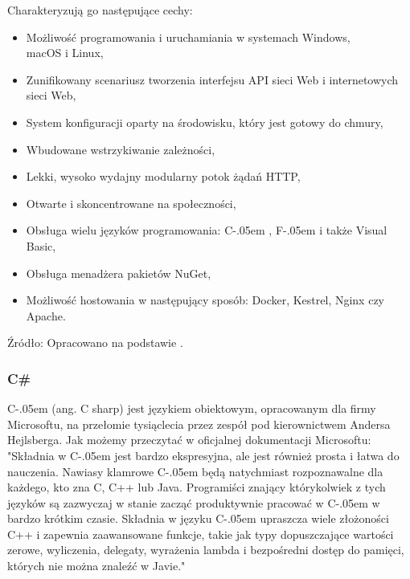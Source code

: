 \documentclass[12pt]{article}
\newcommand{\Csharp}{%
  {\settoheight{\dimen0}{C}C\kern-.05em \resizebox{!}{\dimen0}{\raisebox{\depth}{\# }}}}
\newcommand{\Fsharp}{%
  {\settoheight{\dimen0}{F}F\kern-.05em \resizebox{!}{\dimen0}{\raisebox{\depth}{\# }}}}
\numberwithin{figure}{section}
\begin{document}
Charakteryzują go następujące cechy:
    \begin{itemize}
        \item Możliwość programowania i uruchamiania w systemach Windows,\\ macOS i Linux,
        \item Zunifikowany scenariusz tworzenia interfejsu API sieci Web i internetowych sieci Web,
        \item System konfiguracji oparty na środowisku, który jest gotowy do chmury,
        \item Wbudowane wstrzykiwanie zależności,
        \item Lekki, wysoko wydajny modularny potok żądań HTTP,
        \item Otwarte i skoncentrowane na społeczności,
        \item Obsługa wielu języków programowania: \Csharp, \Fsharp i także Visual Basic,
        \item Obsługa menadżera pakietów NuGet,
        \item Możliwość hostowania w następujący sposób: Docker, Kestrel, Nginx czy Apache.
    \end{itemize}

Źródło: Opracowano na podstawie \cite{dotnet-core}.

\subsubsection{C\#}
\Csharp (ang. C sharp) jest językiem obiektowym, opracowanym dla firmy Microsoftu, na przełomie tysiąclecia przez zespół pod kierownictwem Andersa Hejlsberga. Jak możemy przeczytać w oficjalnej dokumentacji Microsoftu: 
"Składnia w \Csharp jest bardzo ekspresyjna, ale jest również prosta i łatwa do nauczenia. Nawiasy klamrowe \Csharp będą natychmiast rozpoznawalne dla każdego, kto zna C, C++ lub Java. Programiści znający którykolwiek z tych języków są zazwyczaj w stanie zacząć produktywnie pracować w \Csharp w bardzo krótkim czasie. Składnia w języku \Csharp upraszcza wiele złożoności C++ i zapewnia zaawansowane funkcje, takie jak typy dopuszczające wartości zerowe, wyliczenia, delegaty, wyrażenia lambda i bezpośredni dostęp do pamięci, których nie można znaleźć w Javie." \cite{csharp} 
    
\end{document}
